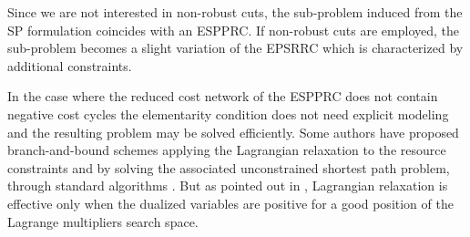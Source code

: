 Since we are not interested in non-robust cuts, the sub-problem
induced from the SP formulation coincides with an ESPPRC.
If non-robust cuts are employed, the sub-problem becomes
a slight variation of the EPSRRC which is characterized by additional constraints.

\medskip

In the case where the reduced cost network of the ESPPRC does not contain negative cost cycles
the elementarity condition does not need explicit modeling
and the resulting problem may be solved efficiently.
Some authors have proposed branch-and-bound
schemes applying the Lagrangian relaxation to the resource constraints
and by solving the associated unconstrained shortest path
problem, through standard algorithms \parencite{beasley1989, carlyle2008}.
But as pointed out in \textcite{righini2004},
Lagrangian relaxation is effective only when the dualized variables
are positive for a good position of the Lagrange multipliers search space.

\begin{comment}
\cite{bettinelli2010mathematical} ---------------
It is possible to address the pricing problem by optimizing its relaxation,
obtained by dropping the elementarity constraints. Solving a resource con-
strained shortest path problem (RCSPP) requires less computing time but
yields less tight lower bounds, since columns may include cycles. The two
different approaches have been followed for instance by Feillet et al. [42] and
Desrochers et al. [29] to solve the vehicle routing problem with time windows
(VRPTW) through column generation.
\end{comment}

